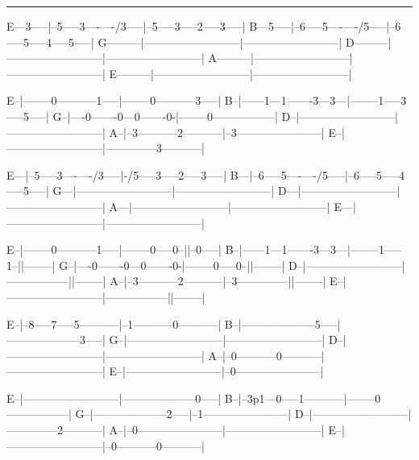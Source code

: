 \noindent\rule{\columnwidth}{1pt}

\begin{lsttab}
E---3-----|--5-----3----\2----/3-----|--5-----3-----2-----3-----|
B---5-----|--6-----5----\4----/5-----|--6-----5-----4-----5-----|
G---------|--------------------------|--------------------------|
D---------|--------------------------|--------------------------|
A---------|--------------------------|--------------------------|
E---------|--------------------------|--------------------------|

E--|--------0-----------1-----|--------0-----------3-----|
B--|------1---1-------3---3---|--------1-----3-----5-----|
G--|----0-------0---0-------0-|--------0-----------------|
D--|--------------------------|--------------------------|
A--|--3-----------2-----------|--3-----------------------|
E--|--------------------------|--------------3-----------|

E---|--5-----3----\2----/3-----|-/5-----3-----2-----3-----|
B---|--6-----5----\4----/5-----|--6-----5-----4-----5-----|
G---|--------------------------|--------------------------|
D---|--------------------------|--------------------------|
A---|--------------------------|--------------------------|
E---|--------------------------|--------------------------|

E--|--------0-----------1-----|--------0-----0--||--0-----|
B--|------1---1-------3---3---|--------1-----1--||--------|
G--|----0-------0---0-------0-|--------0-----0--||--------|
D--|--------------------------|-----------------||--------|
A--|--3-----------2-----------|--3--------------||--------|
E--|--------------------------|-----------------||--------|

E--|--8-----7-----5-----------|--1-----------0-----------|
B--|--------------------5-----|--------------------3-----|
G--|--------------------------|--------------------------|
D--|--------------------------|--------------------------|
A--|--0-----------0-----------|--------------------------|
E--|--------------------------|--0-----------------------|

E--|--------------------------|--------------------0-----|
B--|--3p1---0-----1-----------|--------0-----------------|
G--|--------------------2-----|--1-----------------------|
D--|--------------------------|--------------2-----------|
A--|--0-----------------------|--------------------------|
E--|--------------------------|--0-----------0-----------|


\end{lsttab}
